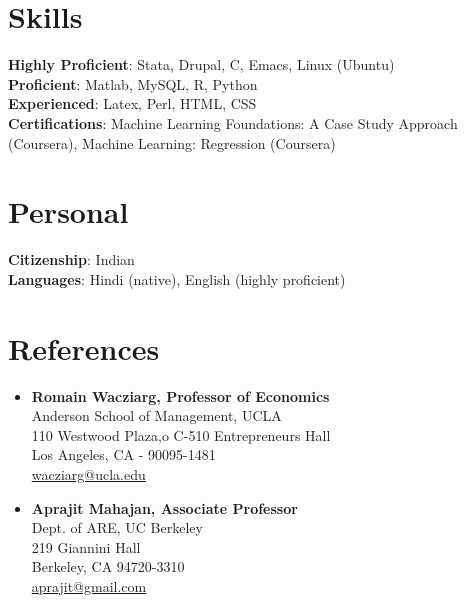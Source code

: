 \documentclass[11pt]{article}
\begin{document}
\section{Skills}
\label{sec-6}
\textbf{Highly Proficient}: Stata, Drupal, C, Emacs, Linux (Ubuntu) \\
\textbf{Proficient}: Matlab, MySQL, R, Python \\
\textbf{Experienced}: Latex, Perl, HTML, CSS \\
\textbf{Certifications}: Machine Learning Foundations: A Case Study Approach (Coursera), Machine Learning: Regression (Coursera) \\
\pagebreak
\section{Personal}
\label{sec-7}
\textbf{Citizenship}: Indian \\
\textbf{Languages}: Hindi (native), English (highly proficient)\\
\section{References}
\label{sec-8}
\vspace{-0.2in}
\begin{multicols}{2}
\begin{itemize}
\item \textbf{Romain Wacziarg, Professor of Economics} \\
  Anderson School of Management, UCLA \\
  110 Westwood Plaza,o C-510 Entrepreneurs Hall\\
  Los Angeles, CA - 90095-1481\\
  \href{mailto:wacziarg@ucla.edu}{wacziarg@ucla.edu}\\
\end{itemize}
\begin{itemize}
\item \textbf{Aprajit Mahajan, Associate Professor} \\
  Dept. of ARE, UC Berkeley \\
  219 Giannini Hall\\
  Berkeley, CA 94720-3310\\
  \href{mailto:aprajit@gmail.com}{aprajit@gmail.com}\\
\end{itemize}
\end{multicols}
\end{document}
